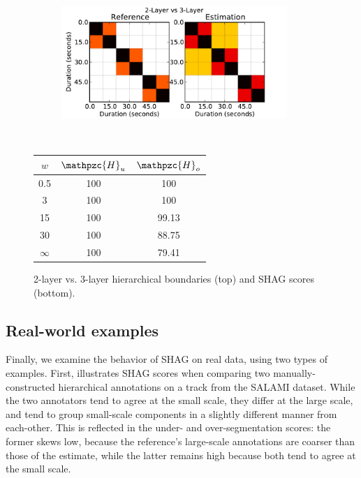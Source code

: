 \documentclass{article}
\def\shag{\ensuremath{\mathpzc{H}}}
\begin{document}
\begin{figure}[t]
  \centering
  \begin{subfigure}{0.5\textwidth}
    \centering
    \includegraphics[width=0.94\textwidth]{plots/hier-hiercomp.pdf}
  \end{subfigure}%
  \\
  \begin{minipage}{0.5\textwidth}
    \centering
    \vspace{10pt}
    \begin{tabular}{|c|c|c|}
      \hline
      $w$       & $\shag_u$       & $\shag_o$      \\
      \hline
      0.5       & 100       & 100      \\     
      3         & 100       & 100      \\
      15        & 100       & 99.13    \\
      30        & 100       & 88.75    \\
      $\infty$  & 100       & 79.41    \\
      \hline
    \end{tabular}
  \end{minipage}
  \caption{2-layer vs. 3-layer hierarchical boundaries (top) and SHAG scores (bottom).}
  \label{fig:hier-hiercomp}
\end{figure}


\subsection{Real-world examples}
Finally, we examine the behavior of SHAG on real data, using two types of examples.
First,  illustrates SHAG scores when comparing two manually-constructed hierarchical annotations on a track from the SALAMI dataset.
While the two annotators tend to agree at the small scale, they differ at the large scale, and tend to group small-scale components in a slightly different manner from each-other.
This is reflected in the under- and over-segmentation scores: the former skews low,
because the reference's large-scale annotations are coarser than those of the
estimate, while the latter remains high because both tend to agree at the small scale.
\end{document}
